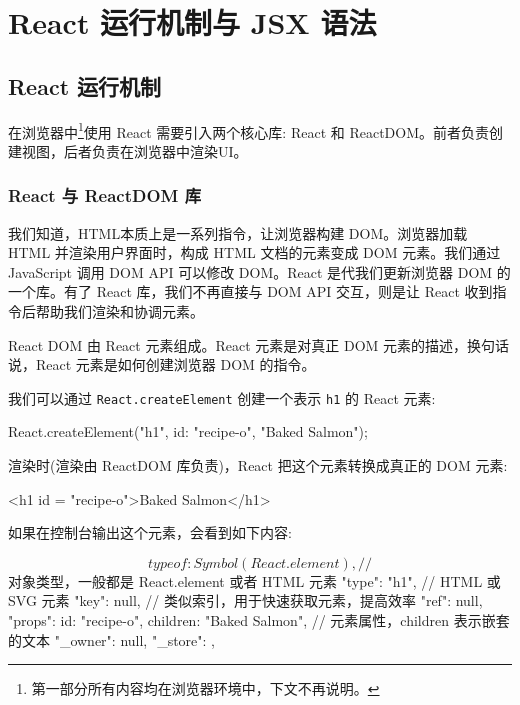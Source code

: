 \section{React 运行机制与 JSX 语法}

\subsection{React 运行机制}

在浏览器中\footnote{第一部分所有内容均在浏览器环境中，下文不再说明。}使用 React 需要引入两个核心库: React 和 ReactDOM。前者负责创建视图，后者负责在浏览器中渲染UI。

\subsubsection*{React 与 ReactDOM 库}

我们知道，HTML本质上是一系列指令，让浏览器构建 DOM。浏览器加载 HTML 并渲染用户界面时，构成 HTML 文档的元素变成 DOM 元素。我们通过 JavaScript 调用 DOM API 可以修改 DOM。React 是代我们更新浏览器 DOM 的一个库。有了 React 库，我们不再直接与 DOM API 交互，则是让 React 收到指令后帮助我们渲染和协调元素。

React DOM 由 React 元素组成。React 元素是对真正 DOM 元素的描述，换句话说，React 元素是如何创建浏览器 DOM 的指令。

我们可以通过 \texttt{React.createElement} 创建一个表示 \texttt{h1} 的 React 元素:

\begin{JavaScript}
React.createElement("h1", {id: "recipe-o"}, "Baked Salmon");
\end{JavaScript}

渲染时(渲染由 ReactDOM 库负责)，React 把这个元素转换成真正的 DOM 元素:

\begin{HTML}
<h1 id = "recipe-o">Baked Salmon</h1>
\end{HTML}

如果在控制台输出这个元素，会看到如下内容:

\begin{JavaScript}
{
    $$typeof: Symbol(React.element),    // $$ 对象类型，一般都是 React.element 或者 HTML 元素
    "type": "h1",   // HTML 或 SVG 元素
    "key": null,    // 类似索引，用于快速获取元素，提高效率
    "ref": null,    
    "props": {id: "recipe-o", children: "Baked Salmon"},    // 元素属性，children 表示嵌套的文本
    "_owner": null,
    "_store": {},
}
\end{JavaScript}

